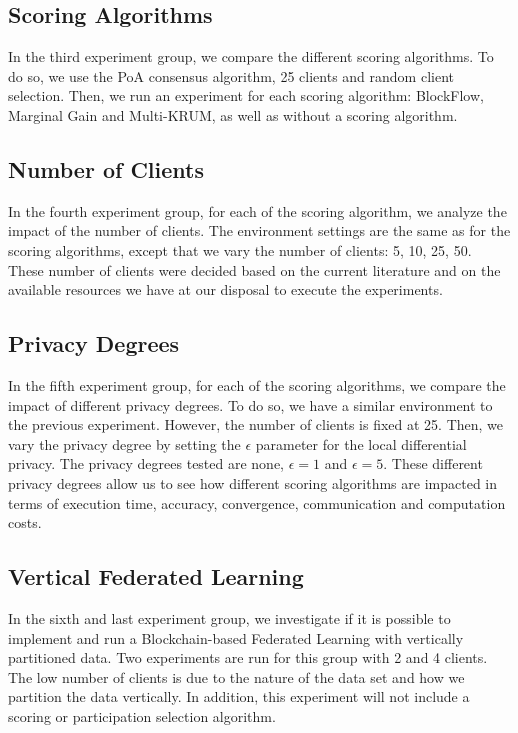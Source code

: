 \subsection{Scoring Algorithms}

In the third experiment group, we compare the different scoring algorithms. To do so, we use the PoA consensus algorithm, 25 clients and random client selection. Then, we run an experiment for each scoring algorithm: BlockFlow, Marginal Gain and Multi-KRUM, as well as without a scoring algorithm.

\subsection{Number of Clients}

In the fourth experiment group, for each of the scoring algorithm, we analyze the impact of the number of clients. The environment settings are the same as for the scoring algorithms, except that we vary the number of clients: 5, 10, 25, 50. These number of clients were decided based on the current literature and on the available resources we have at our disposal to execute the experiments.

\subsection{Privacy Degrees}

In the fifth experiment group, for each of the scoring algorithms, we compare the impact of different privacy degrees. To do so, we have a similar environment to the previous experiment. However, the number of clients is fixed at 25. Then, we vary the privacy degree by setting the $\epsilon$ parameter for the local differential privacy. The privacy degrees tested are none, $\epsilon = 1$ and $\epsilon = 5$. These different privacy degrees allow us to see how different scoring algorithms are impacted in terms of execution time, accuracy, convergence, communication and computation costs.

\subsection{Vertical Federated Learning}

In the sixth and last experiment group, we investigate if it is possible to implement and run a Blockchain-based Federated Learning with vertically partitioned data. Two experiments are run for this group with 2 and 4 clients. The low number of clients is due to the nature of the data set and how we partition the data vertically. In addition, this experiment will not include a scoring or participation selection algorithm.

